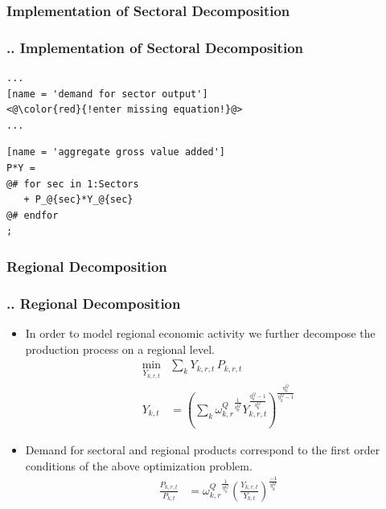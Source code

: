 \documentclass[11pt,aspectratio=169]{beamer}
\begin{document}
\subsubsection{Implementation of Sectoral Decomposition}
\begin{frame}[fragile]
\frametitle{{\thesection.\thesubsection.\thesubsubsection} Implementation of Sectoral Decomposition}
\begin{lstlisting}[frame = single]
...
[name = 'demand for sector output']
<@\color{red}{!enter missing equation!}@>
...
\end{lstlisting}

\begin{lstlisting}[frame = single]
[name = 'aggregate gross value added']
P*Y = 
@# for sec in 1:Sectors
   + P_@{sec}*Y_@{sec}
@# endfor
;
\end{lstlisting}

\end{frame}


\subsubsection{Regional Decomposition}
\begin{frame}
\frametitle{{\thesection.\thesubsection.\thesubsubsection} Regional Decomposition}
\scriptsize
\begin{itemize}
\item In order to model regional economic activity we further decompose the production process on a regional level.
\begin{align*}
\underset{Y_{k,r,t}}{\mathrm{min}} & \sum_{k} Y_{k,r,t} \, P_{k,r,t} \\ 
Y_{k,t} &= \left(\sum_{k} {\omega^{Q}_{k,r}}^{\frac{1}{\eta^Q_{k}}} Y_{k,r,t}^{\frac{\eta^Q_{k}-1}{\eta^Q_{k}}} \right)^{\frac{\eta^Q_{k}}{\eta^Q_{k}-1}}
\end{align*}
\item Demand for sectoral and regional products correspond to the first order conditions of the above optimization problem.
\begin{align*}
\frac{P_{k,r,t}}{P_{k,t}} &= {\omega^{Q}_{k,r}}^{\frac{1}{\eta^{Q}_{k}}} \left(\frac{Y_{k,r,t}}{Y_{k,t}}\right)^{\frac{-1}{\eta^{Q}_{k}}}
\end{align*}
\end{itemize}
\end{frame}
\end{document}
